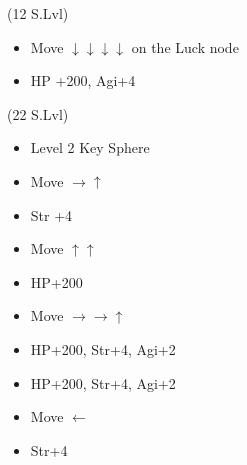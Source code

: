 \begin{spheregrid}
    \begin{itemize}
        \kimahrif (12 S.Lvl)
        \begin{itemize}
            \item Move $\downarrow\downarrow\downarrow\downarrow$ on the Luck node
            \item HP +200, Agi+4
        \end{itemize}
        \tidusf (22 S.Lvl)
        \begin{itemize}
            \item Level 2 Key Sphere
            \item Move $\rightarrow\uparrow$
            \item Str +4
            \item Move $\uparrow\uparrow$
            \item HP+200
            \item Move $\rightarrow\rightarrow\uparrow$
            \item HP+200, Str+4, Agi+2
            \item HP+200, Str+4, Agi+2
            \item Move $\leftarrow$
            \item Str+4
        \end{itemize}
    \end{itemize}
\end{spheregrid}
